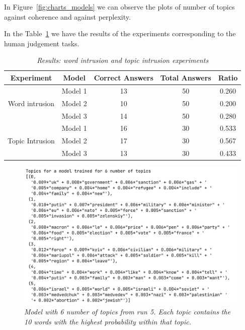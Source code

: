 \documentclass[twoside,12pt,a4paper]{article}
\begin{document}
In Figure~\ref{fig:charts_models} we can observe the plots of number of topics against coherence and against perplexity.

In the Table~\ref{table:forms_results} we have the results of the experiments corresponding to the human judgement tasks.\\

\begin{table}[h!]
\centering
\begin{tabular}{c c c c c} 
\hline
Experiment & Model & Correct Answers & Total Answers & Ratio \\ [0.5ex] 
\hline
& Model 1 & 13 & 50 & 0.260\\ 
Word intrusion & Model 2 & 10 & 50 & 0.200 \\
& Model 3 & 14 & 50 & 0.280 \\ [1ex] 
\hline
& Model 1 & 16 & 30 & 0.533 \\
Topic Intrusion & Model 2 & 17 & 30 & 0.567 \\
& Model 3 & 13 & 30 & 0.433 \\ [1ex] 
\hline
\end{tabular}
\caption{\textit{Results: word intrusion and topic intrusion experiments}}
\label{table:forms_results}
\end{table}

\hfill \break
\begin{figure}[h]
\centering
\includegraphics[scale=0.4]{6_topics.png}
\caption{\textit{Model with 6 number of topics from run 5. Each topic contains the 10 words with the highest probability within that topic.}}
\label{fig:6_topics}
\end{figure}
\end{document}
